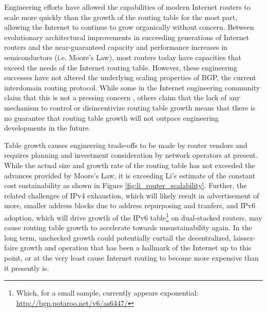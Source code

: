 


Engineering efforts have allowed the capabilities of modern Internet routers to scale more quickly than the growth of the routing table for the most part, allowing the Internet to continue to grow organically without concern. Between evolutionary architectural improvements in succeeding generations of Internet routers \cite{McKeown:2006kx} and the near-guaranteed capacity and performance increases in semiconductors (i.e. Moore's Law), most routers today have capacities that exceed the needs of the Internet routing table. However, these engineering successes have not altered the underlying scaling properties of BGP, the current interdomain routing protocol. While some in the Internet engineering community claim that this is not a pressing concern \cite{Huston:2011ys, Huston:2009dq}, others \cite{Li:2011vn} claim that the lack of any mechanism to control or disincentivize routing table growth means that there is no guarantee that routing table growth will not outpace engineering developments in the future.

Table growth causes engineering trade-offs to be made by router vendors \cite{Li:2011vn, Fall:2009fk} and requires planning and investment consideration by network operators \cite{Zhao:2010fu} at present. While the actual size and growth rate of the routing table has not exceeded the advances provided by Moore's Law, it is exceeding Li's estimate of the constant cost sustainability as shown in Figure \ref{fig:li_router_scalability}. Further, the related challenges of IPv4 exhaustion, which will likely result in advertisement of more, smaller address blocks due to address repurposing and tranfers, and IPv6 adoption, which will drive growth of the IPv6 table\footnote{Which, for a small sample, currently appears exponential: \url{http://bgp.potaroo.net/v6/as6447/}} on dual-stacked routers, may cause routing table growth to accelerate towards unsustainability again. In the long term, unchecked growth could potentially curtail the decentralized, laissez-faire growth and operation that has been a hallmark of the Internet up to this point, or at the very least cause Internet routing to become more expensive than it presently is.

